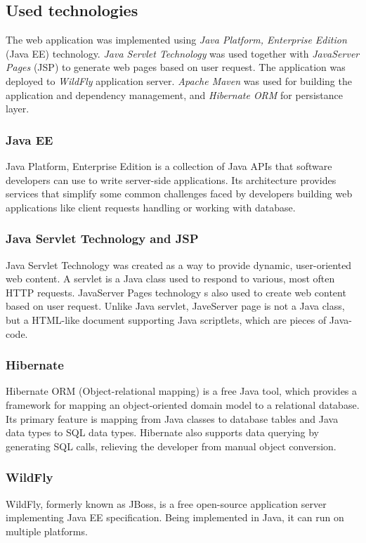 \documentclass[thesis=B,english]{FITthesis}[2012/06/26]
\begin{document}
	\subsection{Used technologies}
	The web application was implemented using \emph{Java Platform, Enterprise Edition} (Java EE) technology. \emph{Java Servlet Technology} was used together with \emph{JavaServer Pages} (JSP) to generate web pages based on user request. The application was deployed to \emph{WildFly} application server. \emph{Apache Maven} was used for building the application and dependency management, and \emph{Hibernate ORM} for persistance layer.
	\subsubsection{Java EE}
	Java Platform, Enterprise Edition is a collection of Java APIs that software developers can use to write server-side applications. Its architecture provides services that simplify some common challenges faced by developers building web applications like client requests handling or working with database.
	\subsubsection{Java Servlet Technology and JSP}
	Java Servlet Technology was created as a way to provide dynamic, user-oriented web content. A servlet is a Java class used to respond to various, most often HTTP requests. JavaServer Pages technology s also used to create web content based on user request. Unlike Java servlet, JaveServer page is not a Java class, but a HTML-like document supporting Java scriptlets, which are pieces of Java-code.
	\subsubsection{Hibernate}
	Hibernate ORM (Object-relational mapping) is a free Java tool, which provides a framework for mapping an object-oriented domain model to a relational database. Its primary feature is mapping from Java classes to database tables and Java data types to SQL data types. Hibernate also supports data querying by generating SQL calls, relieving the developer from manual object conversion.
	\subsubsection{WildFly}
	WildFly, formerly known as JBoss, is a free open-source application server implementing Java EE specification. Being implemented in Java, it can run on multiple platforms.
\end{document}
